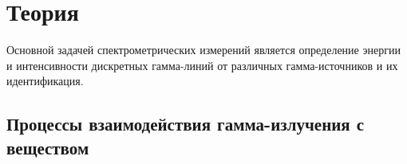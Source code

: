 

\newcommand{\formula}[2]
{
    \begin{equation}\label{#1}
        #2
    \end{equation}
}

\newcommand{\mth}[1]
{
    \begin{math}
        #1
    \end{math}
}

\newcommand{\ruB}[1]
{
    _{\text{#1}}
}

\setcounter{PicsCounter}{1}

\newcommand{\pic}[3]{
    \begin{center}
        \begin{minipage}[h!]{#1}
            \begin{center}

                \texttt{[image: \#2]}
                \textit{Рис \arabic{PicsCounter}. #3}

            \end{center}
        \end{minipage}
    \end{center}

    \stepcounter{PicsCounter}
}

\setcounter{TablesCounter}{1}

\newcommand{\tableLable}[1]{
    \textit{Таблица \arabic{TablesCounter}: #1}

    \stepcounter{TablesCounter}
}

\section{Теория}

Основной задачей спектрометрических измерений является определение энергии и
интенсивности дискретных гамма-линий от различных гамма-источников и их идентификация.

\subsection{Процессы взаимодействия гамма-излучения с веществом}

